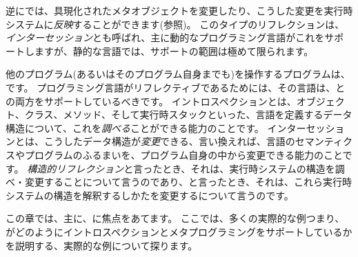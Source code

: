 \documentclass[a4paper,10pt,twoside]{book}
\begin{document}
逆に\st{}では、具現化されたメタオブジェクトを変更したり、こうした変更を実行時システムに\emph{反映}することができます(参照)。
このタイプのリフレクションは、\emph{インターセッション}とも呼ばれ、主に動的なプログラミング言語がこれをサポートしますが、静的な言語では、サポートの範囲は極めて限られます。

他のプログラム(あるいはそのプログラム自身までも)を操作するプログラムは、です。
プログラミング言語がリフレクティブであるためには、その言語は、との両方をサポートしているべきです。
イントロスペクションとは、オブジェクト、クラス、メソッド、そして実行時スタックといった、言語を定義するデータ構造について、これを\emph{調べる}ことができる能力のことです。
インターセッションとは、こうしたデータ構造が\emph{変更}できる、言い換えれば、言語のセマンティクスやプログラムのふるまいを、プログラム自身の中から変更できる能力のことです。
\emph{構造的リフレクション}と言ったとき、それは、実行時システムの構造を調べ・変更することについて言うのであり、と言ったとき、それは、これら実行時システムの構造を解釈するしかたを変更するについて言うのです。

この章では、主に、に焦点をあてます。
ここでは、多くの実際的な例つまり、\st{}がどのようにイントロスペクションとメタプログラミングをサポートしているかを説明する、実際的な例について探ります。
\end{document}
